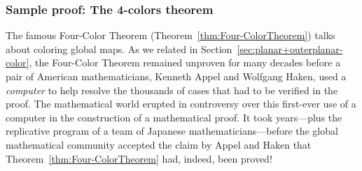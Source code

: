 \subsubsection{Sample proof: The 4-colors theorem}

The famous Four-Color Theorem
(Theorem~\ref{thm:Four-ColorTheorem}) talks about coloring
global maps.  As we related in
Section~\ref{sec:planar+outerplanar-color}, the Four-Color Theorem
remained unproven for many decades before a pair of American
mathematicians, Kenneth Appel  and Wolfgang
Haken,  used a {\it computer} to help resolve
the thousands of cases that had to be verified in the proof.  The
mathematical world erupted in controversy over this first-ever use of
a computer in the construction of a mathematical proof.  It took
years---plus the replicative program of a team of Japanese
mathematicians---before the global mathematical community accepted the
claim by Appel and Haken that Theorem~\ref{thm:Four-ColorTheorem} had,
indeed, been proved!


%
%
%


